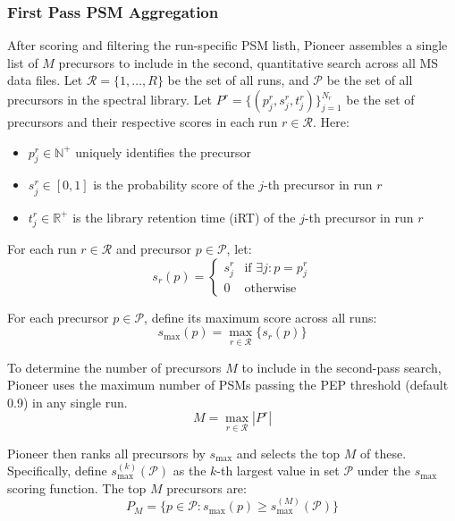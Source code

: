 \documentclass[pdflatex,sn-nature]{sn-jnl}
\begin{document}
\subsubsection{First Pass PSM Aggregation}
After scoring and filtering the run-specific PSM listh, Pioneer assembles a single list of $M$ precursors to include in the second, quantitative search across all MS data files. Let $\mathcal{R} = \{1, \ldots, R\}$ be the set of all runs, and $\mathcal{P}$ be the set of all precursors in the spectral library. Let $P^{r} = \{(p_j^{r}, s_j^{r}, t_j^{r})\}_{j=1}^{N_r}$ be the set of precursors and their respective scores in each run $r \in \mathcal{R}$. Here:
\begin{itemize}
\item $p_j^{r} \in \mathbb{N}^+$ uniquely identifies the precursor
\item $s_j^{r} \in [0,1]$ is the probability score of the $j$-th precursor in run $r$
\item $t_j^{r} \in \mathbb{R}^+$ is the library retention time (iRT) of the $j$-th precursor in run $r$
\end{itemize}

For each run $r \in \mathcal{R}$ and precursor $p \in \mathcal{P}$, let:
\begin{equation}
    s_r(p) = \begin{cases}
        s_j^{r} & \text{if } \exists j : p = p_j^{r} \\
        0 & \text{otherwise}
    \end{cases}
\end{equation}

For each precursor $p \in \mathcal{P}$, define its maximum score across all runs:
\begin{equation}
    s_{\text{max}}(p) = \max_{r \in \mathcal{R}} \{s_r(p)\}
\end{equation}

To determine the number of precursors $M$ to include in the second-pass search, Pioneer uses the maximum number of PSMs passing the PEP threshold (default 0.9) in any single run.
\begin{equation}
    M = \max_{r \in \mathcal{R}} |P^r|
\end{equation}

Pioneer then ranks all precursors by $s_{\text{max}}$ and selects the top $M$ of these. Specifically, define $s_{\text{max}}^{(k)}(\mathcal{P})$ as the $k$-th largest value in set $\mathcal{P}$ under the $s_{\text{max}}$ scoring function. The top $M$ precursors are:
\begin{equation}
    P_M = \{p \in \mathcal{P} : s_{\text{max}}(p) \geq s_{\text{max}}^{(M)}(\mathcal{P})\}
\end{equation}
\end{document}
